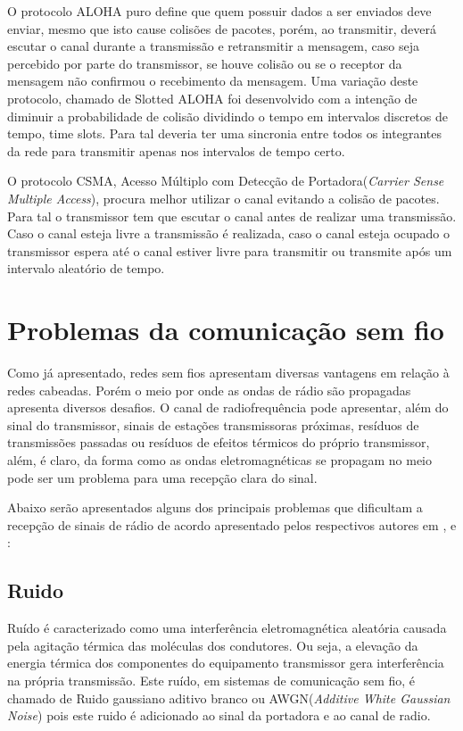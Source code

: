 O protocolo ALOHA puro define que quem possuir dados a ser enviados deve enviar, mesmo que isto cause colisões de pacotes, porém, ao transmitir, deverá escutar o canal durante a transmissão e retransmitir a mensagem, caso seja percebido por parte do transmissor, se houve colisão ou se o receptor da mensagem não confirmou o recebimento da mensagem. Uma variação deste protocolo, chamado de Slotted ALOHA foi desenvolvido com a intenção de diminuir a probabilidade de colisão dividindo o tempo em intervalos discretos de tempo, time slots. Para tal deveria ter uma sincronia entre todos os integrantes da rede para transmitir apenas nos intervalos de tempo certo.

O protocolo CSMA, Acesso Múltiplo com Detecção de Portadora(\emph{Carrier Sense Multiple Access}), procura melhor utilizar o canal evitando a colisão de pacotes. Para tal o transmissor tem que escutar o canal antes de realizar uma transmissão. Caso o canal esteja livre a transmissão é realizada, caso o canal esteja ocupado o transmissor espera até o canal estiver livre para transmitir ou transmite após um intervalo aleatório de tempo.


\section{Problemas da comunicação sem fio}
Como já apresentado, redes sem fios apresentam diversas vantagens em relação à redes cabeadas. Porém o meio por onde as ondas de rádio são propagadas apresenta diversos desafios. O canal de radiofrequência pode apresentar, além do sinal do transmissor, sinais de estações transmissoras próximas, resíduos de transmissões passadas ou resíduos de efeitos térmicos do próprio transmissor, além, é claro, da forma como as ondas eletromagnéticas se propagam no meio pode ser um problema para uma recepção clara do sinal.

Abaixo serão apresentados alguns dos principais problemas que dificultam a recepção de sinais de rádio de acordo apresentado pelos respectivos autores em \cite{gomes2017estimaccao}, \cite{rappaport2009} e \cite{rochol2018sistemas}:
\subsection*{Ruido}
Ruído é caracterizado como uma interferência eletromagnética aleatória causada pela agitação térmica das moléculas dos condutores. Ou seja, a elevação da energia térmica dos componentes do equipamento transmissor gera interferência na própria transmissão. Este ruído, em sistemas de comunicação sem fio, é chamado de Ruido gaussiano aditivo branco ou AWGN(\emph{Additive White Gaussian Noise}) pois este ruido é adicionado ao sinal da portadora e ao canal de radio.

